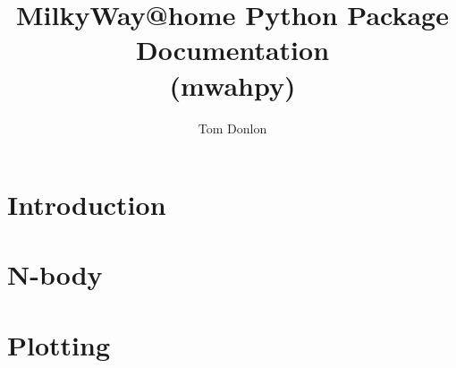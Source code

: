 \documentclass{article}
\author{Tom Donlon}
\title{MilkyWay@home Python Package Documentation \\ (mwahpy)}
\begin{document}
\maketitle

\section{Introduction}

\section{N-body}

\section{Plotting}
\end{document}
